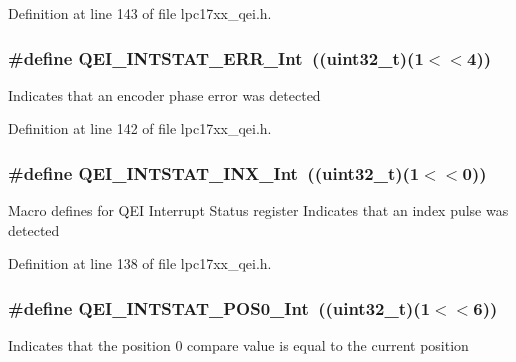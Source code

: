 \-Definition at line 143 of file lpc17xx\-\_\-qei.\-h.

\hypertarget{group___q_e_i___private___macros_gafc3dab21c61a8f409fe0cafd63e1d917}{
\subsubsection[{\-Q\-E\-I\-\_\-\-I\-N\-T\-S\-T\-A\-T\-\_\-\-E\-R\-R\-\_\-\-Int}]{\setlength{\rightskip}{0pt plus 5cm}\#define {\bf \-Q\-E\-I\-\_\-\-I\-N\-T\-S\-T\-A\-T\-\_\-\-E\-R\-R\-\_\-\-Int}~((uint32\-\_\-t)(1$<$$<$4))}}\label{group___q_e_i___private___macros_gafc3dab21c61a8f409fe0cafd63e1d917}
\-Indicates that an encoder phase error was detected 

\-Definition at line 142 of file lpc17xx\-\_\-qei.\-h.

\hypertarget{group___q_e_i___private___macros_gaea897986e188ae7c379f3a5aac42cfe3}{
\subsubsection[{\-Q\-E\-I\-\_\-\-I\-N\-T\-S\-T\-A\-T\-\_\-\-I\-N\-X\-\_\-\-Int}]{\setlength{\rightskip}{0pt plus 5cm}\#define {\bf \-Q\-E\-I\-\_\-\-I\-N\-T\-S\-T\-A\-T\-\_\-\-I\-N\-X\-\_\-\-Int}~((uint32\-\_\-t)(1$<$$<$0))}}\label{group___q_e_i___private___macros_gaea897986e188ae7c379f3a5aac42cfe3}
\-Macro defines for \-Q\-E\-I \-Interrupt \-Status register \-Indicates that an index pulse was detected 

\-Definition at line 138 of file lpc17xx\-\_\-qei.\-h.

\hypertarget{group___q_e_i___private___macros_ga2d8a45ff072d2a26c97acce3149e6dc5}{
\subsubsection[{\-Q\-E\-I\-\_\-\-I\-N\-T\-S\-T\-A\-T\-\_\-\-P\-O\-S0\-\_\-\-Int}]{\setlength{\rightskip}{0pt plus 5cm}\#define {\bf \-Q\-E\-I\-\_\-\-I\-N\-T\-S\-T\-A\-T\-\_\-\-P\-O\-S0\-\_\-\-Int}~((uint32\-\_\-t)(1$<$$<$6))}}\label{group___q_e_i___private___macros_ga2d8a45ff072d2a26c97acce3149e6dc5}
\-Indicates that the position 0 compare value is equal to the current position 

